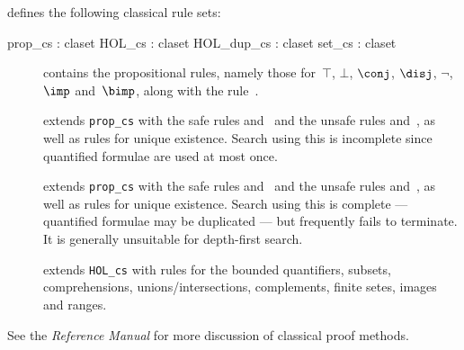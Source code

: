 {\HOL} defines the following classical rule sets:
\begin{ttbox} 
prop_cs    : claset
HOL_cs     : claset
HOL_dup_cs : claset
set_cs     : claset
\end{ttbox}
\begin{description}
\item[] contains the propositional rules, namely
those for~$\top$, $\bot$, $\conj$, $\disj$, $\neg$, $\imp$ and~$\bimp$,
along with the rule~.

\item[] 
extends {\tt prop_cs} with the safe rules  and~
and the unsafe rules  and~, as well as rules for
unique existence.  Search using this is incomplete since quantified
formulae are used at most once.

\item[] 
extends {\tt prop_cs} with the safe rules  and~
and the unsafe rules  and~, as well as
rules for unique existence.  Search using this is complete --- quantified
formulae may be duplicated --- but frequently fails to terminate.  It is
generally unsuitable for depth-first search.

\item[] 
extends {\tt HOL_cs} with rules for the bounded quantifiers, subsets,
comprehensions, unions/intersections, complements, finite setes, images and
ranges.
\end{description}
\noindent
See the {\em Reference Manual} for more discussion of classical proof
methods.


